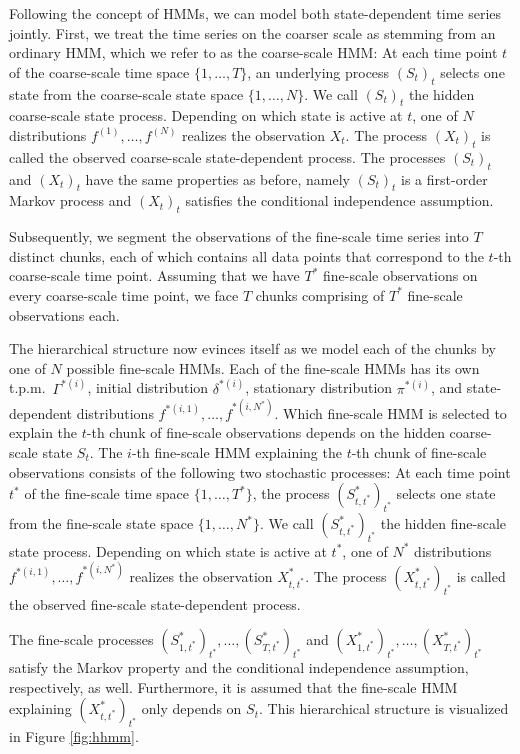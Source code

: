 \documentclass[article]{jss}
\begin{document}
Following the concept of HMMs, we can model both state-dependent time series jointly. First, we treat the time series on the coarser scale as stemming from an ordinary HMM, which we refer to as the coarse-scale HMM: At each time point $t$ of the coarse-scale time space $\{1,\dots,T\}$, an underlying process $(S_t)_t$ selects one state from the coarse-scale state space $\{1,\dots,N\}$. We call $(S_t)_t$ the hidden coarse-scale state process. Depending on which state is active at $t$, one of $N$ distributions $f^{(1)},\dots,f^{(N)}$ realizes the observation $X_t$. The process $(X_t)_t$ is called the observed coarse-scale state-dependent process. The processes $(S_t)_t$ and $(X_t)_t$ have the same properties as before, namely $(S_t)_t$ is a first-order Markov process and $(X_t)_t$ satisfies the conditional independence assumption. 


Subsequently, we segment the observations of the fine-scale time series into $T$ distinct chunks, each of which contains all data points that correspond to the $t$-th coarse-scale time point. Assuming that we have $T^*$ fine-scale observations on every coarse-scale time point, we face $T$ chunks comprising of $T^*$ fine-scale observations each. 

The hierarchical structure now evinces itself as we model each of the chunks by one of $N$ possible fine-scale HMMs. Each of the fine-scale HMMs has its own t.p.m.\ $\Gamma^{*(i)}$, initial distribution $\delta^{*(i)}$, stationary distribution $\pi^{*(i)}$, and state-dependent distributions $f^{*(i,1)},\dots,f^{*(i,N^*)}$. Which fine-scale HMM is selected to explain the $t$-th chunk of fine-scale observations depends on the hidden coarse-scale state $S_t$. The $i$-th fine-scale HMM explaining the $t$-th chunk of fine-scale observations consists of the following two stochastic processes: At each time point $t^*$ of the fine-scale time space $\{1,\dots,T^*\}$, the process $(S^*_{t,t^*})_{t^*}$ selects one state from the fine-scale state space $\{1,\dots,N^*\}$. We call $(S^*_{t,t^*})_{t^*}$ the hidden fine-scale state process. Depending on which state is active at $t^*$, one of $N^*$ distributions $f^{*(i,1)},\dots,f^{*(i,N^*)}$ realizes the observation $X^*_{t,t^*}$. The process $(X^*_{t,t^*})_{t^*}$ is called the observed fine-scale state-dependent process. 

The fine-scale processes $(S^*_{1,t^*})_{t^*},\dots,(S^*_{T,t^*})_{t^*}$ and $(X^*_{1,t^*})_{t^*},\dots,(X^*_{T,t^*})_{t^*}$ satisfy the Markov property and the conditional independence assumption, respectively, as well. Furthermore, it is assumed that the fine-scale HMM explaining $(X^*_{t,t^*})_{t^*}$ only depends on $S_t$. This hierarchical structure is visualized in Figure \ref{fig:hhmm}.
\end{document}
